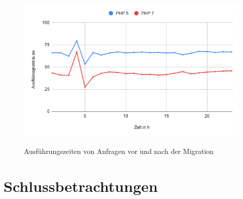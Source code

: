 \begin{figure}[bth]
    \myfloatalign
    {\includegraphics[width=1\linewidth]{gfx/chart}} \quad
    \caption[Ausführungszeiten von Anfragen vor und nach der Migration]{Ausführungszeiten von Anfragen vor und nach der Migration}\label{fig:time}
\end{figure}


\chapter{Schlussbetrachtungen}
 
